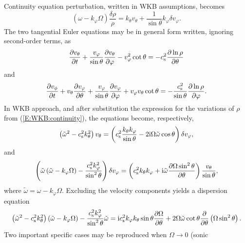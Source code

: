 \documentclass[usenatbib,onecolumn]{mnras}
\newcommand{\pardir}[2]{\ensuremath{\frac{\partial #2}{\partial #1} }}
\newcommand{\ppardir}[2]{\ensuremath{\frac{\partial }{\partial #1} \left( #2\right)}}
\newcommand{\cs}{\ensuremath{c_{\rm s}}}
\renewcommand{\i}{\ensuremath{{\rm i}}}
\begin{document}
Continuity equation perturbation, written in WKB assumptions, becomes
\begin{equation}\label{E:WKB:continuity}
\displaystyle \left(\omega-k_\varphi \Omega\right) \frac{\delta \rho}{\rho} = k_\theta v_\theta +
\frac{1}{\sin \theta} k_\varphi \delta v_\varphi.
\end{equation}
The two tangential Euler equations may be in general form written, ignoring
second-order terms, as
\begin{equation}\label{E:WKB:Eulertheta}
\displaystyle \pardir{t}{v_\theta} + \frac{v_\varphi}{\sin \theta}
\pardir{\varphi}{v_\theta} - v_\varphi^2 \cot \theta = -\cs^2
\pardir{\theta}{\ln \rho}
\end{equation}
and
\begin{equation}\label{E:WKB:Eulerphi}
\displaystyle  \pardir{t}{v_\phi} + v_\theta \pardir{\theta}{v_\varphi}
  +\frac{v_\varphi}{\sin\theta}\pardir{\varphi}{v_\varphi}+ v_\varphi v_\theta
  \cot \theta = -\frac{\cs^2 }{\sin \theta} \pardir{\varphi}{\ln \rho}.
\end{equation}
In WKB approach, and after substitution the expression for the variations
of $\rho$ from (\ref{E:WKB:continuity}), the equations become, respectively,
\begin{equation}\label{E:WKB:theta}
\displaystyle \left(\tilde{\omega}^2 - \cs^2 k_\theta^2\right) v_\theta=
\left( \cs^2 \frac{k_\theta k_\varphi}{\sin\theta} - 2 \i \Omega
\tilde{\omega} \cos\theta\right) \delta v_\varphi,
\end{equation}
and
\begin{equation}\label{E:WKB:phi}
\displaystyle
\left(\tilde{\omega}\left(\tilde{\omega}-k_\varphi\Omega\right)-\frac{\cs^2
  k_\varphi^2}{\sin^2\theta}\right)\delta v_\varphi = \left( \cs^2 k_\theta
k_\varphi  + \i \tilde{\omega} \pardir{\theta}{\Omega \sin^2\theta}\right)
\frac{v_\theta}{\sin \theta},
\end{equation}
where $\tilde{\omega} = \omega - k_\varphi \Omega$. 
Excluding the velocity components yields a dispersion equation
\begin{equation}\label{E:WKB:deq}
\displaystyle \left( \tilde{\omega}^2 - \cs^2 k_\theta^2\right)\left(
\tilde{\omega}-k_\varphi \Omega\right) - \frac{\cs^2
  k_\varphi^2}{\sin^2\theta}\tilde{\omega} = \i \cs^2 k_\varphi k_\theta
\sin\theta \pardir{\theta}{\Omega} + 2\Omega \tilde{\omega} \cot\theta
\ppardir{\theta}{\Omega \sin^2\theta}.
\end{equation}
Two important specific cases may be reproduced when $\Omega \to 0$ (sonic
\end{document}
